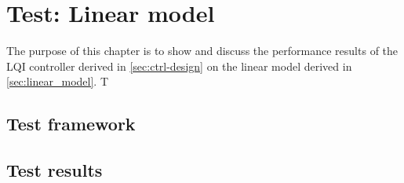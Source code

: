 \section{Test: Linear model}
The purpose of this chapter is to show and discuss the performance results of the LQI controller derived in \cref{sec:ctrl-design} on the linear model derived in \cref{sec:linear_model}. T

\subsection{Test framework}



\subsection{Test results}